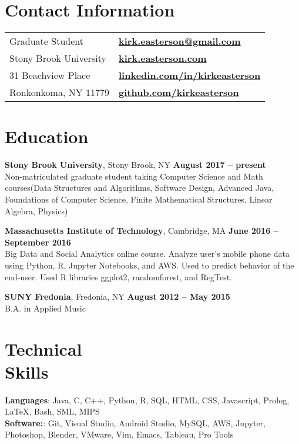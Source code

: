\documentclass[margin,line]{res}
\begin{document}

\begin{resume}
\section{\sc Contact Information}

\vspace{.05in}
\begin{tabular}{@{}p{3.5in}p{3in}}
Graduate Student      & {\bf \href{mailto:kirk.easterson@gmail.com}{kirk.easterson@gmail.com}} \\
Stony Brook University & {\bf \href{http://www.kirkeasterson.com}{kirk.easterson.com}}\\
31 Beachview Place & {\bf \href{http://www.linkedin.com/in/kirkeasterson}{linkedin.com/in/kirkeasterson}}\\
Ronkonkoma, NY 11779 & {\bf \href{https://www.github.com/kirkeasterson}{github.com/kirkeasterson}}
\end{tabular}

\section{\sc Education}
{\bf Stony Brook University}, Stony Brook, NY \hfill {\bf August 2017 -- present}\\
Non-matriculated graduate student taking Computer Science and Math courses(Data Structures and Algorithms, Software Design, Advanced Java, Foundations of Computer Science, Finite Mathematical Structures, Linear Algebra, Physics)

{\bf Massachusetts Institute of Technology}, Cambridge, MA \hfill {\bf June 2016 -- September 2016}\\
Big Data and Social Analytics online course. Analyze user's mobile phone data using Python, R, Jupyter Notebooks, and AWS. Used to predict behavior of the end-user. Used R libraries ggplot2, randomforest, and RegTest.

{\bf SUNY Fredonia}, Fredonia, NY \hfill {\bf August 2012 -- May 2015}\\
B.A. in Applied Music

\section{\sc Technical\\Skills}
{\bf Languages}:  Java, C, C++, Python, R, SQL, HTML, CSS, Javascript, Prolog, {\LaTeX}, Bash, SML, MIPS\\
{\bf Software:}: Git, Visual Studio, Android Studio, MySQL, AWS, Jupyter, Photoshop, Blender, VMware, Vim, Emacs, Tableau, Pro Tools


\end{resume}
\end{document}
